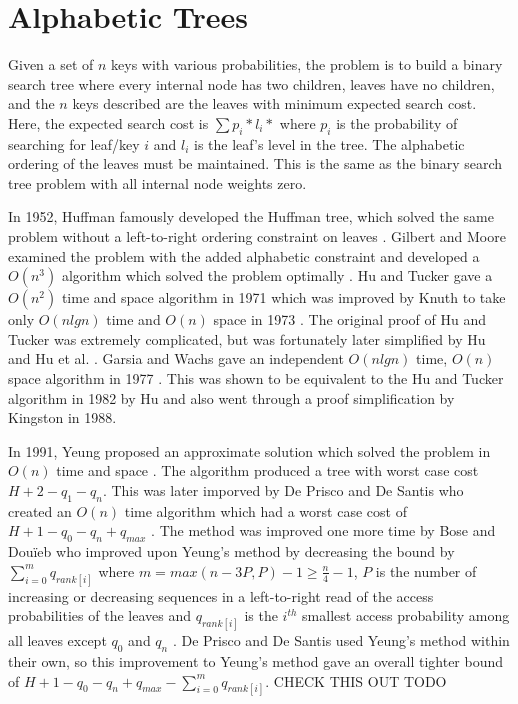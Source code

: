 \documentclass[letterpaper,12pt,titlepage,oneside,final]{book}
\theoremstyle{plain}
\begin{document}
\section{Alphabetic Trees}

Given a set of $n$ keys with various probabilities, the problem is to build a binary search tree where every internal node has two children, leaves have no children, and the $n$ keys described are the leaves with minimum expected search cost. Here, the expected search cost is $\sum p_i * l_i*$ where $p_i$ is the probability of searching for leaf/key $i$ and $l_i$ is the leaf's level in the tree. The alphabetic ordering of the leaves must be maintained. This is the same as the binary search tree problem with all internal node weights zero.

In 1952, Huffman famously developed the Huffman tree, which solved the same problem without a left-to-right ordering constraint on leaves \cite{huffman1952method}. Gilbert and Moore examined the problem with the added alphabetic constraint and developed a $O(n^3)$ algorithm which solved the problem optimally \cite{gilbert1959variable}. Hu and Tucker gave a $O(n^2)$ time and space algorithm in 1971 \cite{hu1971optimal} which was improved by Knuth to take only $O(n lg n)$ time and $O(n)$ space in 1973 \cite{knuth1973sorting}. The original proof of Hu and Tucker was extremely complicated, but was fortunately later simplified by Hu \cite{hu1973new} and Hu et al. \cite{hu1979binary}. Garsia and Wachs gave an independent $O(n lg n)$ time, $O(n)$ space algorithm in 1977 \cite{garsia1977new}. This was shown to be equivalent to the Hu and Tucker algorithm in 1982 by Hu \cite{Hu1982Book} and also went through a proof simplification \cite{kingston1988new} by Kingston in 1988.

In 1991, Yeung proposed an approximate solution which solved the problem in $O(n)$ time and space \cite{yeung1991alphabetic}. The algorithm produced a tree with worst case cost $H + 2 - q_1-q_n$. This was later imporved by De Prisco and De Santis who created an $O(n)$ time algorithm which had a worst case cost of $H+1-q_0-q_n+q_{max}$ \cite{de1993binary}. The method was improved one more time by Bose and Dou\"{i}eb who improved upon Yeung's method by decreasing the bound by $\sum_{i=0}^m q_{rank[i]}$ where $m=max({n-3P,P})-1 \geq \frac{n}{4} - 1$, $P$ is the number of increasing or decreasing sequences in a left-to-right read of the access probabilities of the leaves and $q_{rank[i]}$ is the $i^{th}$ smallest access probability among all leaves except $q_0$ and $q_n$ \cite{bose2009efficient}. De Prisco and De Santis used Yeung's method within their own, so this improvement to Yeung's method gave an overall tighter bound of $H+1-q_0-q_n+q_{max}-\sum_{i=0}^m q_{rank[i]}$. CHECK THIS OUT TODO
\end{document}
